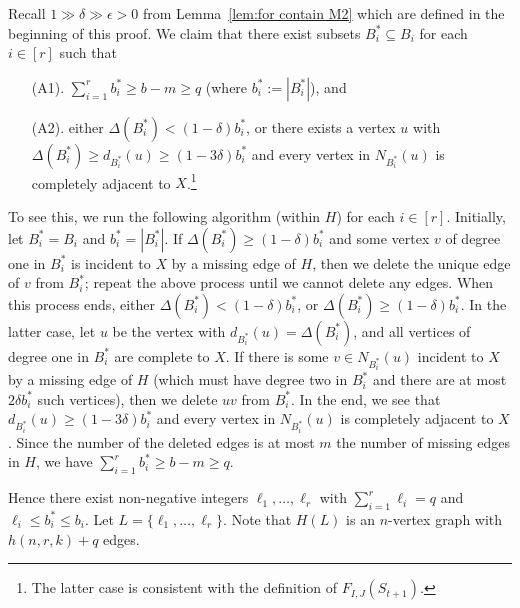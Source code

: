 \documentclass[10pt]{article}
\begin{document}
Recall $1\gg\delta\gg \epsilon>0$ from Lemma~\ref{lem:for contain M2} which are defined in the beginning of this proof.
We claim that there exist subsets $B_i^\ast\subseteq B_i$ for each $i\in [r]$ such that
\begin{itemize}
\item[(A1).] $\sum_{i=1}^{r}b^\ast_i \geq b-m\geq q$ (where $b^\ast_i:=|B^\ast_i|$), and
\item[(A2).] either $\Delta(B^\ast_i)<(1-\delta)b^\ast_i$, or there exists a vertex $u$ with $\Delta(B^\ast_i)\geq d_{B^\ast_i}(u)\geq (1-3\delta)b^\ast_i$ and every vertex in $N_{B^\ast_i}(u)$ is completely adjacent to $X$.\footnote{The latter case is consistent with the definition of $F_{I,J}(S_{t+1})$.}
\end{itemize}
To see this, we run the following algorithm (within $H$) for each $i\in [r]$.
Initially, let $B^\ast_i=B_i$ and $b^\ast_i= |B^\ast_i|$.
If $\Delta(B^\ast_i)\geq (1-\delta)b^\ast_i$ and some vertex $v$ of degree one in $B^\ast_i$ is incident to $X$ by a missing edge of $H$,
then we delete the unique edge of $v$ from $B^\ast_i$;
repeat the above process until we cannot delete any edges.
When this process ends, either $\Delta(B^\ast_i)<(1-\delta)b^\ast_i$, or $\Delta(B^\ast_i)\geq (1-\delta)b^\ast_i$.
In the latter case, let $u$ be the vertex with $d_{B^\ast_i}(u)=\Delta(B^\ast_i)$, and all vertices of degree one in $B^\ast_i$ are complete to $X$.
If there is some $v\in N_{B^\ast_i}(u)$ incident to $X$ by a missing edge of $H$ (which must have degree two in $B^\ast_i$ and there are at most $2\delta b^\ast_i$ such vertices), then we delete $uv$ from $B^\ast_i$.
In the end, we see that $d_{B^\ast_i}(u)\geq (1-3\delta)b^\ast_i$ and every vertex in $N_{B^\ast_i}(u)$ is completely adjacent to $X$.
Since the number of the deleted edges is at most $m$ the number of missing edges in $H$,
we have $\sum_{i=1}^{r}b^\ast_i \geq b-m\geq q$.

Hence there exist non-negative integers $\ell_1, \ldots, \ell_{r}$ with $\sum_{i=1}^{r}\ell_i=q$ and $\ell_i\leq b^\ast_i\leq b_i$.
Let $L=\{\ell_1, \ldots, \ell_{r}\}$. Note that $H(L)$ is an $n$-vertex graph with $h(n,r,k)+q$ edges.
\end{document}
